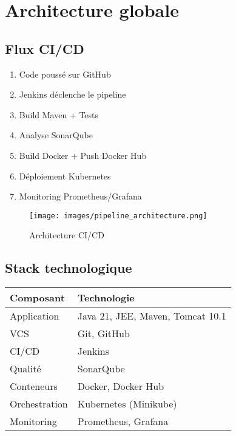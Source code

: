 \documentclass[11pt,a4paper]{article}
\begin{document}
\newpage

\section{Architecture globale}

\subsection{Flux CI/CD}
\begin{enumerate}
    \item Code poussé sur GitHub
    \item Jenkins déclenche le pipeline
    \item Build Maven + Tests
    \item Analyse SonarQube
    \item Build Docker + Push Docker Hub
    \item Déploiement Kubernetes
    \item Monitoring Prometheus/Grafana
\end{enumerate}

\begin{figure}[H]
    \centering
    \texttt{[image: images/pipeline\_architecture.png]}
    \caption{Architecture CI/CD}
\end{figure}

\subsection{Stack technologique}
\begin{table}[H]
\centering
\begin{tabular}{|l|l|}
\hline
\textbf{Composant} & \textbf{Technologie} \\ \hline
Application & Java 21, JEE, Maven, Tomcat 10.1 \\ \hline
VCS & Git, GitHub \\ \hline
CI/CD & Jenkins \\ \hline
Qualité & SonarQube \\ \hline
Conteneurs & Docker, Docker Hub \\ \hline
Orchestration & Kubernetes (Minikube) \\ \hline
Monitoring & Prometheus, Grafana \\ \hline
\end{tabular}
\end{table}

\newpage
\end{document}
